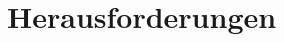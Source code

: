 \section{Herausforderungen}\label{Herausforderungen}

\renewcommand{\kapitelautor}{Autor: Dominik Nußbaumer}

    
